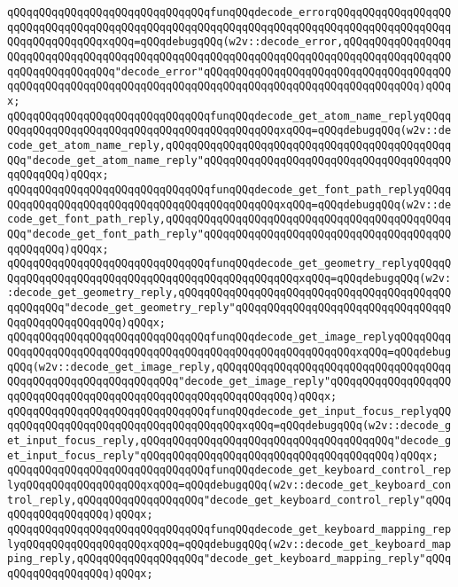 \verb|qQQqqQQqqQQqqQQqqQQqqQQqqQQqqQQqfunqQQqdecode_errorqQQqqQQqqQQqqQQqqQQqqQQqqQQqqQQqqQQqqQQqqQQqqQQqqQQqqQQqqQQqqQQqqQQqqQQqqQQqqQQqqQQqqQQqqQQqqQQqqQQqqQQqxqQQq=qQQqdebugqQQq(w2v::decode_error,qQQqqQQqqQQqqQQqqQQqqQQqqQQqqQQqqQQqqQQqqQQqqQQqqQQqqQQqqQQqqQQqqQQqqQQqqQQqqQQqqQQqqQQqqQQqqQQqqQQqqQQq"decode_error"qQQqqQQqqQQqqQQqqQQqqQQqqQQqqQQqqQQqqQQqqQQqqQQqqQQqqQQqqQQqqQQqqQQqqQQqqQQqqQQqqQQqqQQqqQQqqQQqqQQqqQQq)qQQqx;|\newline
\verb|qQQqqQQqqQQqqQQqqQQqqQQqqQQqqQQqfunqQQqdecode_get_atom_name_replyqQQqqQQqqQQqqQQqqQQqqQQqqQQqqQQqqQQqqQQqqQQqqQQqxqQQq=qQQqdebugqQQq(w2v::decode_get_atom_name_reply,qQQqqQQqqQQqqQQqqQQqqQQqqQQqqQQqqQQqqQQqqQQqqQQq"decode_get_atom_name_reply"qQQqqQQqqQQqqQQqqQQqqQQqqQQqqQQqqQQqqQQqqQQqqQQq)qQQqx;|\newline
\verb|qQQqqQQqqQQqqQQqqQQqqQQqqQQqqQQqfunqQQqdecode_get_font_path_replyqQQqqQQqqQQqqQQqqQQqqQQqqQQqqQQqqQQqqQQqqQQqqQQqxqQQq=qQQqdebugqQQq(w2v::decode_get_font_path_reply,qQQqqQQqqQQqqQQqqQQqqQQqqQQqqQQqqQQqqQQqqQQqqQQq"decode_get_font_path_reply"qQQqqQQqqQQqqQQqqQQqqQQqqQQqqQQqqQQqqQQqqQQqqQQq)qQQqx;|\newline
\verb|qQQqqQQqqQQqqQQqqQQqqQQqqQQqqQQqfunqQQqdecode_get_geometry_replyqQQqqQQqqQQqqQQqqQQqqQQqqQQqqQQqqQQqqQQqqQQqqQQqqQQqxqQQq=qQQqdebugqQQq(w2v::decode_get_geometry_reply,qQQqqQQqqQQqqQQqqQQqqQQqqQQqqQQqqQQqqQQqqQQqqQQqqQQq"decode_get_geometry_reply"qQQqqQQqqQQqqQQqqQQqqQQqqQQqqQQqqQQqqQQqqQQqqQQqqQQq)qQQqx;|\newline
\verb|qQQqqQQqqQQqqQQqqQQqqQQqqQQqqQQqfunqQQqdecode_get_image_replyqQQqqQQqqQQqqQQqqQQqqQQqqQQqqQQqqQQqqQQqqQQqqQQqqQQqqQQqqQQqqQQqxqQQq=qQQqdebugqQQq(w2v::decode_get_image_reply,qQQqqQQqqQQqqQQqqQQqqQQqqQQqqQQqqQQqqQQqqQQqqQQqqQQqqQQqqQQqqQQq"decode_get_image_reply"qQQqqQQqqQQqqQQqqQQqqQQqqQQqqQQqqQQqqQQqqQQqqQQqqQQqqQQqqQQqqQQq)qQQqx;|\newline
\verb|qQQqqQQqqQQqqQQqqQQqqQQqqQQqqQQqfunqQQqdecode_get_input_focus_replyqQQqqQQqqQQqqQQqqQQqqQQqqQQqqQQqqQQqqQQqxqQQq=qQQqdebugqQQq(w2v::decode_get_input_focus_reply,qQQqqQQqqQQqqQQqqQQqqQQqqQQqqQQqqQQqqQQq"decode_get_input_focus_reply"qQQqqQQqqQQqqQQqqQQqqQQqqQQqqQQqqQQqqQQq)qQQqx;|\newline
\verb|qQQqqQQqqQQqqQQqqQQqqQQqqQQqqQQqfunqQQqdecode_get_keyboard_control_replyqQQqqQQqqQQqqQQqqQQqxqQQq=qQQqdebugqQQq(w2v::decode_get_keyboard_control_reply,qQQqqQQqqQQqqQQqqQQq"decode_get_keyboard_control_reply"qQQqqQQqqQQqqQQqqQQq)qQQqx;|\newline
\verb|qQQqqQQqqQQqqQQqqQQqqQQqqQQqqQQqfunqQQqdecode_get_keyboard_mapping_replyqQQqqQQqqQQqqQQqqQQqxqQQq=qQQqdebugqQQq(w2v::decode_get_keyboard_mapping_reply,qQQqqQQqqQQqqQQqqQQq"decode_get_keyboard_mapping_reply"qQQqqQQqqQQqqQQqqQQq)qQQqx;|\newline
